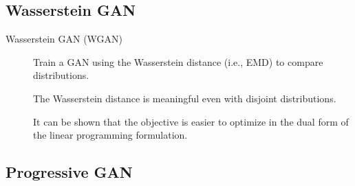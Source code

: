 \subsection{Wasserstein GAN}

\begin{description}
    \item[Wasserstein GAN (WGAN)] 
        Train a GAN using the Wasserstein distance (i.e., EMD) to compare distributions.

        \begin{remark}
            The Wasserstein distance is meaningful even with disjoint distributions.
        \end{remark}

        \begin{remark}
            It can be shown that the objective is easier to optimize in the dual form of the linear programming formulation.
        \end{remark}
\end{description}


\subsection{Progressive GAN}

